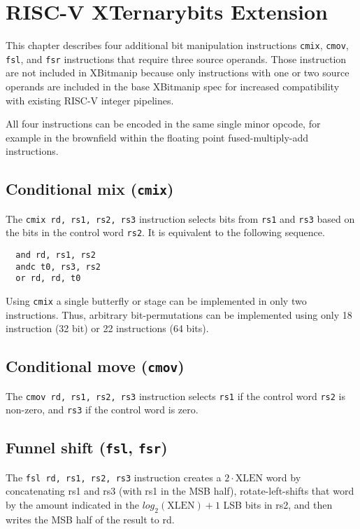 \chapter{RISC-V XTernarybits Extension}
\label{tbits}

This chapter describes four additional bit manipulation instructions {\tt cmix}, {\tt cmov},
{\tt fsl}, and {\tt fsr} instructions that require three source operands. Those instruction
are not included in XBitmanip because only instructions with one or two source operands are
included in the base XBitmanip spec for increased compatibility with existing RISC-V integer
pipelines.

All four instructions can be encoded in the same single minor opcode, for example in the
brownfield within the floating point fused-multiply-add instructions.

\section{Conditional mix ({\tt cmix})}

The {\tt cmix rd, rs1, rs2, rs3} instruction selects bits from {\tt rs1} and {\tt rs3} based
on the bits in the control word {\tt rs2}. It is equivalent to the following sequence.

\begin{verbatim}
  and rd, rs1, rs2
  andc t0, rs3, rs2
  or rd, rd, t0
\end{verbatim}

Using {\tt cmix} a single butterfly or stage can be implemented in only two
instructions. Thus, arbitrary bit-permutations can be implemented using only
18 instruction (32 bit) or 22 instructions (64 bits).



\section{Conditional move ({\tt cmov})}

The {\tt cmov rd, rs1, rs2, rs3} instruction selects {\tt rs1} if the control
word {\tt rs2} is non-zero, and {\tt rs3} if the control word is zero.



\section{Funnel shift ({\tt fsl}, {\tt fsr})}

The {\tt fsl rd, rs1, rs2, rs3} instruction creates a $2\cdot\textrm{XLEN}$ word
by concatenating rs1 and rs3 (with rs1 in the MSB half), rotate-left-shifts that
word by the amount indicated in the $log_2(\textrm{XLEN})+1$ LSB bits in rs2, and
then writes the MSB half of the result to rd.

